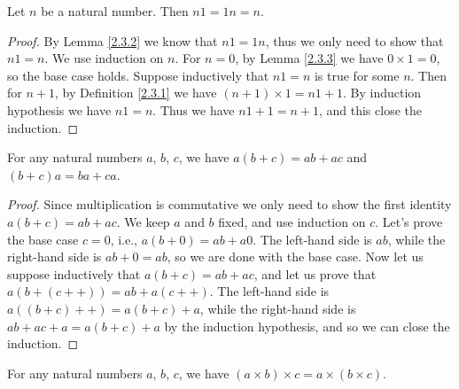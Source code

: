 \begin{additional corollary}\label{ac 2.3.4}
Let \(n\) be a natural number.
Then \(n1 = 1n = n\).
\end{additional corollary}

\begin{proof}
    By Lemma \ref{2.3.2} we know that \(n1 = 1n\), thus we only need to show that \(n1 = n\).
    We use induction on \(n\).
    For \(n=0\), by Lemma \ref{2.3.3} we have \(0 \times 1 = 0\), so the base case holds.
    Suppose inductively that \(n1 = n\) is true for some \(n\).
    Then for \(n + 1\), by Definition \ref{2.3.1} we have \((n + 1) \times 1 = n1 + 1\).
    By induction hypothesis we have \(n1 = n\).
    Thus we have \(n1 + 1 = n + 1\), and this close the induction.
\end{proof}

\begin{proposition}\label{2.3.4}
    For any natural numbers \(a\), \(b\), \(c\), we have \(a(b + c) = ab + ac\) and \((b + c)a = ba + ca\).
\end{proposition}

\begin{proof}
    Since multiplication is commutative we only need to show the first identity \(a(b + c) = ab + ac\).
    We keep \(a\) and \(b\) fixed, and use induction on \(c\).
    Let’s prove the base case \(c = 0\), i.e., \(a(b + 0) = ab + a0\).
    The left-hand side is \(ab\), while the right-hand side is \(ab + 0 = ab\), so we are done with the base case.
    Now let us suppose inductively that \(a(b + c) = ab + ac\), and let us prove that \(a(b + (c++)) = ab + a(c++)\).
    The left-hand side is \(a((b + c)++) = a(b + c) + a\), while the right-hand side is \(ab + ac + a = a(b + c) + a\) by the induction hypothesis, and so we can close the induction.
\end{proof}

\begin{proposition}\label{2.3.5}
    For any natural numbers \(a\), \(b\), \(c\), we have \((a \times b) \times c = a \times (b \times c)\).
\end{proposition}


